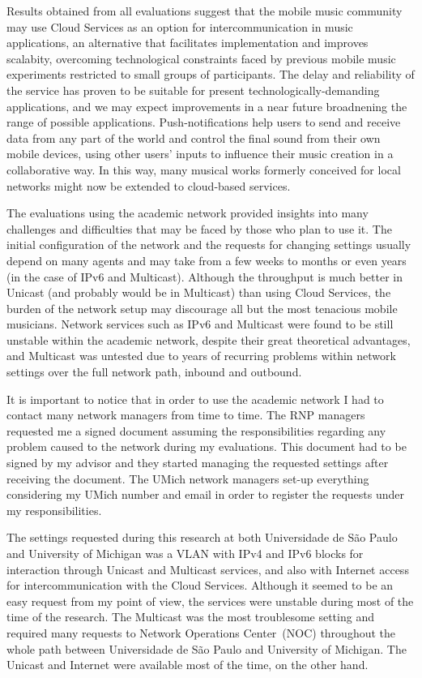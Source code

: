 Results obtained from all evaluations suggest that the mobile music community may use Cloud Services as an option for intercommunication in music applications, an alternative that facilitates implementation and improves scalabity, overcoming technological constraints faced by previous mobile music experiments restricted to small groups of participants.
The delay and reliability of the service has proven to be suitable for present technologically-demanding applications, and we may expect improvements in a near future broadnening the range of possible applications.
Push-notifications help users to send and receive data from any part of the world and control the final sound from their own mobile devices, using other users' inputs to influence their music creation in a collaborative way.
In this way, many musical works formerly conceived for local networks might now be extended to cloud-based services.

The evaluations using the academic network provided insights into many challenges and difficulties that may be faced by those who plan to use it.
The initial configuration of the network and the requests for changing settings usually depend on many agents and may take from a few weeks to months or even years (in the case of IPv6 and Multicast).
Although the throughput is much better in Unicast (and probably would be in Multicast) than using Cloud Services, the burden of the network setup may discourage all but the most tenacious mobile musicians.
Network services such as IPv6 and Multicast were found to be still unstable within the academic network, despite their great theoretical advantages, and Multicast was untested due to years of recurring problems within network settings over the full network path, inbound and outbound.

It is important to notice that in order to use the academic network I had to contact many network managers from time to time.
The RNP managers requested me a signed document assuming the responsibilities regarding any problem caused to the network during my evaluations.
This document had to be signed by my advisor and they started managing the requested settings after receiving the document.
The UMich network managers set-up everything considering my UMich number and email in order to register the requests under my responsibilities.

The settings requested during this research at both Universidade de São Paulo and University of Michigan was a VLAN with IPv4 and IPv6 blocks for interaction through Unicast and Multicast services, and also with Internet access for intercommunication with the Cloud Services.
Although it seemed to be an easy request from my point of view, the services were unstable during most of the time of the research.
The Multicast was the most troublesome setting and required many requests to Network Operations Center~(NOC) throughout the whole path between Universidade de São Paulo and University of Michigan.
The Unicast and Internet were available most of the time, on the other hand.


